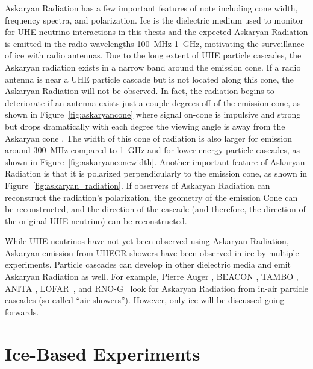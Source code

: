   Askaryan Radiation has a few important features of note including cone width, frequency spectra, and polarization.
  Ice is the dielectric medium used to monitor for UHE neutrino interactions in this thesis and the expected Askaryan Radiation is emitted in the radio-wavelengths 100~MHz-1~GHz, motivating the surveillance of ice with radio antennas. 
  Due to the long extent of UHE particle cascades, the Askaryan radiation exists in a narrow band around the emission cone. 
  If a radio antenna is near a UHE particle cascade but is not located along this cone, the Askaryan Radiation will not be observed.
  In fact, the radiation begins to deteriorate if an antenna exists just a couple degrees off of the emission cone, as shown in Figure~\ref{fig:askaryancone} where signal on-cone is impulsive and strong but drops dramatically with each degree the viewing angle is away from the Askaryan cone \citep{barwick_glaser_review}.
  The width of this cone of radiation is also larger for emission around 300~MHz compared to 1~GHz and for lower energy particle cascades, as shown in Figure~\ref{fig:askaryanconewidth}.
  Another important feature of Askaryan Radiation is that it is polarized perpendicularly to the emission cone, as shown in Figure~\ref{fig:askaryan_radiation}. 
  If observers of Askaryan Radiation can reconstruct the radiation's polarization, the geometry of the emission Cone can be reconstructed, and the direction of the cascade (and therefore, the direction of the original UHE neutrino) can be reconstructed. 

  While UHE neutrinos have not yet been observed using Askaryan Radiation, Askaryan emission from UHECR showers have been observed in ice by multiple experiments\citep{ara_cr, anita_cr, arianna_cr}.
  Particle cascades can develop in other dielectric media and emit Askaryan Radiation as well. 
  For example, Pierre Auger \citep{pierre_auger_uheneutrino}, BEACON \citep{BEACON}, TAMBO \citep{TAMBO}, ANITA \citep{anita_iv}, LOFAR~\citep{LOFAR}, and \mbox{RNO-G}~\citep{rnog_air_cr} look for Askaryan Radiation from in-air particle cascades (so-called ``air showers''). 
  However, only ice will be discussed going forwards.

\section{Ice-Based Experiments}

